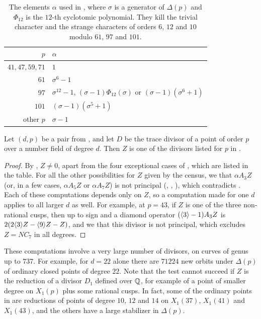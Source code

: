 \begin{table}[H]
\centering
\begin{tabular}{rl}
\toprule
$p$ & $\alpha$\\
\midrule
$41,47,59,71$ & $1$\\
$61$ & $\sigma^6-1$\\
$97$ & $\sigma^{12}-1$, $(\sigma-1)\Phi_{12}(\sigma)$ or $(\sigma-1)(\sigma^6+1)$\\
$101$ & $(\sigma-1)(\sigma^5+1)$\\
other $p$ & $\sigma-1$\\
\bottomrule
\end{tabular}
\medskip
\caption{The elements $\alpha$ used in , where $\sigma$ is a generator of $\Delta(p)$ and $\Phi_{12}$ is the $12$-th cyclotomic polynomial. They kill the trivial character and the strange characters of orders $6$, $12$ and $10$ modulo $61$, $97$ and $101$.}
\label{table:alpha}
\end{table}

\begin{proposition}\label{prop:sieve}
Let $(d,p)$ be a pair from , and let $D$ be the trace divisor of a point of order $p$ over a number field of degree $d$. Then $Z$ is one of the divisors listed for $p$ in .
\end{proposition}

\begin{proof}
By , $Z\neq0$, apart from the four exceptional cases of , which are listed in the table. For all the other possibilities for $Z$ given by the census, we  that $\alpha A_3Z$ (or, in a few cases, $\alpha A_5Z$ or $\alpha A_7Z$) is not principal (, , ), which contradicts . Each of these computations depends only on $Z$, so a computation made for one $d$ applies to all larger $d$ as well. For example, at $p=43$, if $Z$ is one of the three non-rational cusps, then up to sign and a diamond operator $(\langle 3\rangle-1)A_3Z$ is $2(2\langle 3\rangle Z-\langle 9\rangle Z-Z)$, and we  that this divisor is not principal, which excludes $Z=NC_7$ in all degrees.
\end{proof}

These computations involve a very large number of divisors, on curves of genus up to $737$. For example, for $d=22$ alone there are $71224$ new orbits under $\Delta(p)$ of ordinary closed points of degree $22$. Note that the test cannot succeed if $Z$ is the reduction of a divisor $D_1$ defined over $\mathbb{Q}$, for example of a point of smaller degree on $X_1(p)$ plus some rational cusps. In fact, some of the ordinary points in  are reductions of points of degree $10$, $12$ and $14$ on $X_1(37)$, $X_1(41)$ and $X_1(43)$, and the others have a large stabilizer in $\Delta(p)$.

